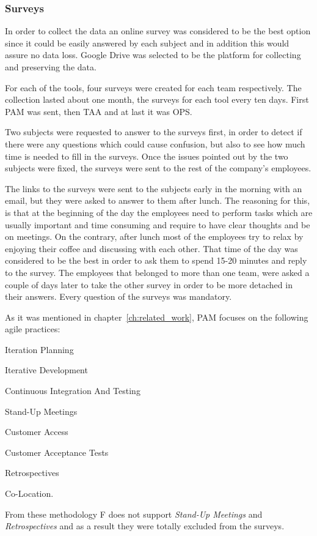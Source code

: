 
\subsubsection{Surveys}
In order to collect the data an online survey was considered to be the best option since it could be easily answered by each subject and in addition this would assure no data loss. Google Drive \texttrademark \cite{google_drive} was selected to be the platform for collecting and preserving the data.

For each of the tools, four surveys were created for each team respectively. The collection lasted about one month, the surveys for each tool every ten days. First PAM was sent, then TAA and at last it was OPS.

Two subjects were requested to answer to the surveys first, in order to detect if there were any questions which could cause confusion, but also to see how much time is needed to fill in the surveys. Once the issues pointed out by the two subjects were fixed, the surveys were sent to the rest of the company's employees.

The links to the surveys were sent to the subjects early in the morning with an email, but they were asked to answer to them after lunch. The reasoning for this, is that at the beginning of the day the employees need to perform tasks which are usually important and time consuming and require to have clear thoughts and be on meetings. On the contrary, after lunch most of the employees try to relax by enjoying their coffee and discussing with each other. That time of the day was considered to be the best in order to ask them to spend 15-20 minutes and reply to the survey. The employees that belonged to more than one team, were asked a couple of days later to take the other survey in order to be more detached in their answers. Every question of the surveys was mandatory.

As it was mentioned in chapter~\ref{ch:related_work}, PAM focuses on the following agile practices:
\begin{inparaenum} [a\upshape)]
	\item Iteration Planning
	\item Iterative Development
	\item Continuous Integration And Testing
	\item Stand-Up Meetings
	\item Customer Access
	\item Customer Acceptance Tests
	\item Retrospectives
	\item Co-Location.
\end{inparaenum}
From these methodology F does not support \textit{Stand-Up Meetings} and \textit{Retrospectives} and as a result they were totally excluded from the surveys.

